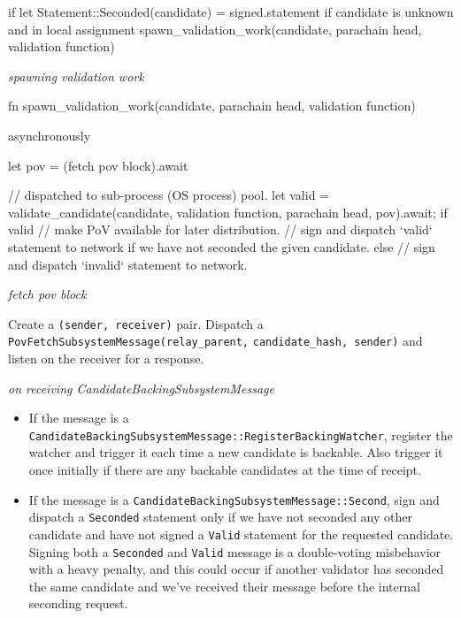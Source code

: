 \begin{verbnobox}[\small]
if let Statement::Seconded(candidate) = signed.statement {
  if candidate is unknown and in local assignment {
    spawn_validation_work(candidate, parachain head, validation function)
  }
}
\end{verbnobox}

\textit{spawning validation work}

\begin{verbnobox}[\small]
fn spawn_validation_work(candidate, parachain head, validation function) {
  asynchronously {
    let pov = (fetch pov block).await

    // dispatched to sub-process (OS process) pool.
    let valid = validate_candidate(candidate, validation function, parachain head, pov).await;
    if valid {
      // make PoV available for later distribution.
      // sign and dispatch `valid` statement to network if we have not seconded the given candidate.
    } else {
      // sign and dispatch `invalid` statement to network.
    }
  }
}
\end{verbnobox}

\textit{fetch pov block}
\newline

Create a \verb|(sender, receiver)| pair. Dispatch a \verb|PovFetchSubsystemMessage(relay_parent,|
\verb|candidate_hash, sender)| and listen on the receiver for a response.
\newline

\textit{on receiving CandidateBackingSubsystemMessage}

\begin{itemize}
    \item If the message is a
    \verb|CandidateBackingSubsystemMessage::RegisterBackingWatcher|, register the
    watcher and trigger it each time a new candidate is backable. Also trigger
    it once initially if there are any backable candidates at the time of
    receipt.
    \item If the message is a \verb|CandidateBackingSubsystemMessage::Second|,
    sign and dispatch a \verb|Seconded| statement only if we have not seconded
    any other candidate and have not signed a \verb|Valid| statement for the
    requested candidate. Signing both a \verb|Seconded| and \verb|Valid| message
    is a double-voting misbehavior with a heavy penalty, and this could occur if
    another validator has seconded the same candidate and we've received their
    message before the internal seconding request.
\end{itemize}

